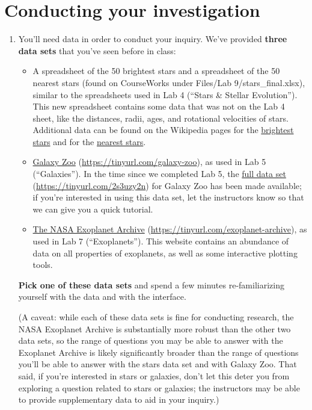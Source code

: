 \documentclass[11pt]{article}%
\begin{document}
\section{Conducting your investigation}

\begin{enumerate}
    \item You’ll need data in order to conduct your inquiry. We've provided \textbf{three data sets} that you've seen before in class:
    \begin{itemize}
        \item A spreadsheet of the 50 brightest stars and a spreadsheet of the 50 nearest stars (found on CourseWorks under Files/Lab 9/stars\_final.xlsx), similar to the spreadsheets used in Lab 4 (``Stars \& Stellar Evolution”). This new spreadsheet contains some data that was not on the Lab 4 sheet, like the distances, radii, ages, and rotational velocities of stars. Additional data can be found on the Wikipedia pages for the \href{https://en.wikipedia.org/wiki/List_of_brightest_stars}{brightest stars} and for the \href{https://en.wikipedia.org/wiki/List_of_nearest_stars_and_brown_dwarfs}{nearest stars}.
        \item \href{https://www.zooniverse.org/projects/zookeeper/galaxy-zoo}{Galaxy Zoo} (\url{https://tinyurl.com/galaxy-zoo}), as used in Lab 5 (``Galaxies”). In the time since we completed Lab 5, the \href{https://mwalmsley-galaxy-poster-gz-decals-mike-walmsley-3pax35.streamlit.app/}{full data set} (\url{https://tinyurl.com/2s3uzy2n}) for Galaxy Zoo has been made available; if you're interested in using this data set, let the instructors know so that we can give you a quick tutorial.
        \item \href{https://exoplanetarchive.ipac.caltech.edu/}{The NASA Exoplanet Archive} (\url{https://tinyurl.com/exoplanet-archive}), as used in Lab 7 (``Exoplanets”). This website contains an abundance of data on all properties of exoplanets, as well as some interactive plotting tools.
    \end{itemize}
    \textbf{Pick one of these data sets} and spend a few minutes re-familiarizing yourself with the data and with the interface.

    (A caveat: while each of these data sets is fine for conducting research, the NASA Exoplanet Archive is substantially more robust than the other two data sets, so the range of questions you may be able to answer with the Exoplanet Archive is likely significantly broader than the range of questions you’ll be able to answer with the stars data set and with Galaxy Zoo. That said, if you’re interested in stars or galaxies, don’t let this deter you from exploring a question related to stars or galaxies; the instructors may be able to provide supplementary data to aid in your inquiry.)


\end{enumerate}
\end{document}
